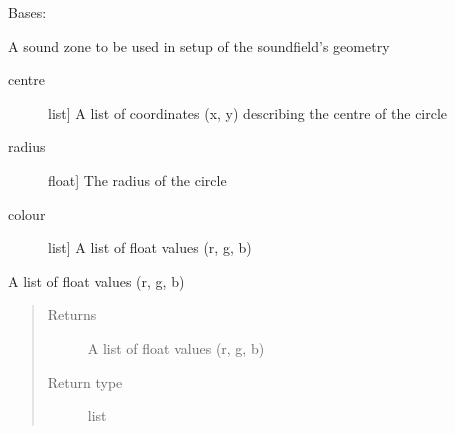 \documentclass[letterpaper,10pt,english]{sphinxmanual}
\begin{document}
\begin{fulllineitems}
\label{\detokenize{source/pyzones:pyzones.Zone}}
Bases: {\hyperref[\detokenize{source/pyzones:pyzones.Circle}]{}}

A sound zone to be used in setup of the soundfield’s geometry
\begin{description}
\item[{centre}] \leavevmode{[}list{]}
A list of coordinates (x, y) describing the centre of the circle

\item[{radius}] \leavevmode{[}float{]}
The radius of the circle

\item[{colour}] \leavevmode{[}list{]}
A list of float values (r, g, b)

\end{description}

\begin{fulllineitems}
\label{\detokenize{source/pyzones:pyzones.Zone.colour}}
A list of float values (r, g, b)
\begin{quote}\begin{description}
\item[{Returns}] \leavevmode
A list of float values (r, g, b)

\item[{Return type}] \leavevmode
list

\end{description}\end{quote}

\end{fulllineitems}


\end{fulllineitems}

\end{document}
